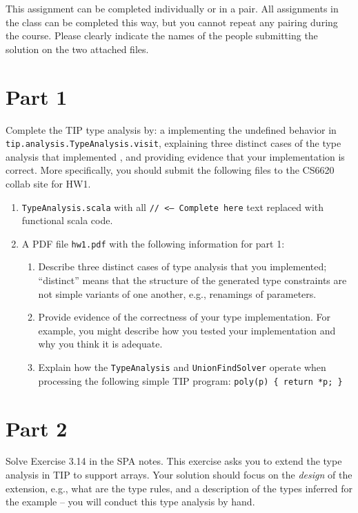\documentclass[12pt,letterpaper]{article}
\begin{document}
This assignment can be completed individually or in a pair.  All assignments in the class can be completed this way, but you cannot repeat any pairing during the course.  Please clearly indicate the names of the people submitting the solution on the two attached files.

\section*{Part 1}
Complete the TIP type analysis by: a implementing the undefined behavior in\\
\texttt{tip.analysis.TypeAnalysis.visit}, explaining three distinct cases of the type analysis that implemented , and providing evidence that your implementation is correct.  More specifically, you should submit the following files to the CS6620 collab site for HW1.
\begin{enumerate}
\item \texttt{TypeAnalysis.scala} with all \texttt{// <--- Complete here} text replaced with functional scala code.
\item A PDF file \texttt{hw1.pdf} with the following information for part 1: 
\begin{enumerate}
\item Describe three distinct cases of type analysis that you implemented; ``distinct'' means that the structure of the generated type constraints are not simple variants of one another, e.g., renamings of parameters. 
\item Provide evidence of the correctness of your type implementation.  For example, you might describe how you tested your implementation and why you think it is adequate.
\item Explain how the \texttt{TypeAnalysis} and \texttt{UnionFindSolver} operate
when processing the following simple TIP program: \texttt{poly(p) \{ return *p; \}}
\end{enumerate}
\end{enumerate}

\section*{Part 2}
Solve Exercise 3.14 in the SPA notes.  This exercise asks you to 
extend the type analysis in TIP to support arrays.   Your solution
should focus on the \textit{design} of the extension, e.g., what 
are the type rules, and a description of the types inferred for the
example -- you will conduct this type analysis by hand.
\end{document}
